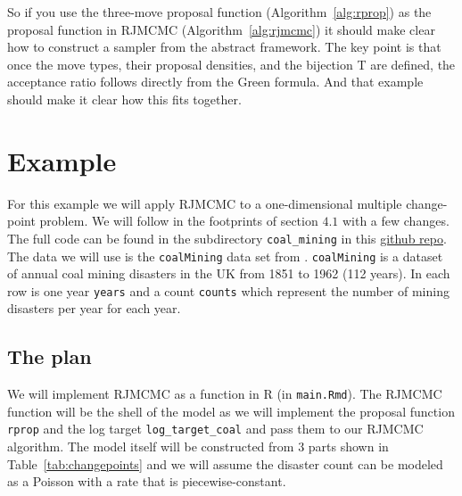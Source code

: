\documentclass[10pt]{article}
\begin{document}
So if you use the three-move proposal function (Algorithm~\ref{alg:rprop}) as the proposal function in RJMCMC (Algorithm~\ref{alg:rjmcmc}) it should make clear how to construct a sampler from the abstract framework. The key point is that once the move types, their proposal densities, and the bijection T are defined, the acceptance ratio follows directly from the Green formula. And that example should make it clear how this fits together. 

\section{Example}
\label{sec:example}

For this example we will apply RJMCMC to a one-dimensional multiple change-point problem. We will follow in the footprints of \cite{green1995reversible} section $4.1$ with a few changes. The full code can be found in the subdirectory \texttt{coal\_mining} in this \href{https://github.com/jacobm3642/RJMCMC_report}{github repo}. The data we will use is the \texttt{coalMining} data set from \cite{GeDsData}. \texttt{coalMining} is a dataset of annual coal mining disasters in the UK from 1851 to 1962 (112 years). In each row is one year \texttt{years} and a count \texttt{counts} which represent the number of mining disasters per year for each year.

\subsection{The plan}
We will implement RJMCMC as a function in R (in \texttt{main.Rmd}). The RJMCMC function will be the shell of the model as we will implement the proposal function \texttt{rprop} and the log target \texttt{log\_target\_coal} and pass them to our RJMCMC algorithm. The model itself will be constructed from 3 parts shown in Table~\ref{tab:changepoints} and we will assume the disaster count can be modeled as a Poisson with a rate that is piecewise-constant.
\end{document}
